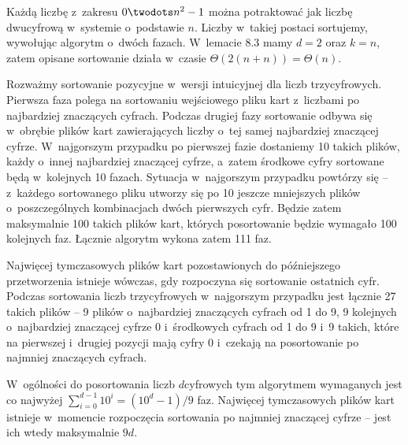 \exercise %
Każdą liczbę z~zakresu $0\twodots n^2-1$ można potraktować jak liczbę dwucyfrową w~systemie o~podstawie $n$.
Liczby w~takiej postaci sortujemy, wywołując algorytm  o~dwóch fazach.
W~lemacie 8.3 mamy $d=2$ oraz $k=n$, zatem opisane sortowanie działa w~czasie $\Theta(2(n+n))=\Theta(n)$.

\exercise %
Rozważmy sortowanie pozycyjne w~wersji intuicyjnej dla liczb trzycyfrowych.
Pierwsza faza polega na sortowaniu wejściowego pliku kart z~liczbami po najbardziej znaczących cyfrach.
Podczas drugiej fazy sortowanie odbywa się w~obrębie plików kart zawierających liczby o~tej samej najbardziej znaczącej cyfrze.
W~najgorszym przypadku po pierwszej fazie dostaniemy 10 takich plików, każdy o~innej najbardziej znaczącej cyfrze, a~zatem środkowe cyfry sortowane będą w~kolejnych 10 fazach.
Sytuacja w~najgorszym przypadku powtórzy się -- z~każdego sortowanego pliku utworzy się po 10 jeszcze mniejszych plików o~poszczególnych kombinacjach dwóch pierwszych cyfr.
Będzie zatem maksymalnie 100 takich plików kart, których posortowanie będzie wymagało 100 kolejnych faz.
Łącznie algorytm wykona zatem 111 faz.

Najwięcej tymczasowych plików kart pozostawionych do późniejszego przetworzenia istnieje wówczas, gdy rozpoczyna się sortowanie ostatnich cyfr.
Podczas sortowania liczb trzycyfrowych w~najgorszym przypadku jest łącznie 27 takich plików -- 9 plików o~najbardziej znaczących cyfrach od 1 do 9, 9 kolejnych o~najbardziej znaczącej cyfrze 0 i~środkowych cyfrach od 1 do 9 i~9 takich, które na pierwszej i~drugiej pozycji mają cyfry 0 i~czekają na posortowanie po najmniej znaczących cyfrach.

W~ogólności do posortowania liczb $d$\nbhyphen cyfrowych tym algorytmem wymaganych jest co najwyżej $\sum_{i=0}^{d-1}10^i=(10^d-1)/9$ faz.
Najwięcej tymczasowych plików kart istnieje w~momencie rozpoczęcia sortowania po najmniej znaczącej cyfrze -- jest ich wtedy maksymalnie $9d$.
